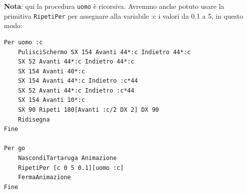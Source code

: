 \textbf{Nota}: qui la procedura \texttt{uomo} è ricorsiva. Avremmo anche potuto usare la  primitiva \texttt{RipetiPer} per assegnare alla variabile :c i valori da 0.1 a 5, in questo modo:
\begin{lstlisting}[caption="Animazione non ricorsiva di un uomo che cresce"]
Per uomo :c
	PulisciSchermo SX 154 Avanti 44*:c Indietro 44*:c 
	SX 52 Avanti 44*:c Indietro 44*:c 
	SX 154 Avanti 40*:c
	SX 154 Avanti 44*:c Indietro :c*44 
	SX 52 Avanti 44*:c Indietro :c*44 
	SX 154 Avanti 10*:c
	SX 90 Ripeti 180[Avanti :c/2 DX 2] DX 90
	Ridisegna
Fine

Per go
	NascondiTartaruga Animazione
	RipetiPer [c 0 5 0.1][uomo :c]
	FermaAnimazione
Fine
\end{lstlisting}